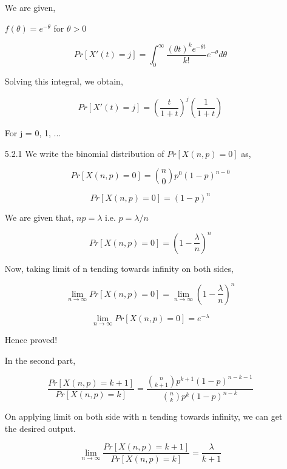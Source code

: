 \documentclass[a4paper,oneside,12pt]{report}
\begin{document}
\begin{enumerate}
	We are given,
	
	$f(\theta) = e^{-\theta}$ for $\theta > 0$
	
	$$Pr[X'(t) = j] = \int_0^{\infty}\frac{(\theta t)^k e^{-\theta t}}{k!} e^{-\theta} d\theta$$

	Solving this integral, we obtain,
	
	$$Pr[X'(t) = j] = \left(\frac{t}{1 + t}\right)^j \left(\frac{1}{1 + t}\right)$$
	
	For j = 0, 1, ...
	
	\item[5.2.1] We write the binomial distribution of $Pr[X(n, p) = 0]$ as,
	
	$$ Pr[X(n, p) = 0] = {n \choose 0} p^0 (1-p)^{n - 0} $$
	
	$$ Pr[X(n, p) = 0] = (1-p)^n $$
	
	We are given that, $np = \lambda$ i.e. $p = \lambda/n$
	
	$$ Pr[X(n, p) = 0] = \left(1-\frac{\lambda}{n}\right)^n $$

	Now, taking limit of n tending towards infinity on both sides,
	
	$$ \lim_{n\to\infty} Pr[X(n, p) = 0] = \lim_{n\to\infty} \left(1-\frac{\lambda}{n}\right)^n $$
	
	$$ \lim_{n\to\infty} Pr[X(n, p) = 0] = e^{-\lambda}$$
	
	Hence proved!
	
	In the second part,
	
	$$\frac{Pr[X(n, p) = k + 1]}{Pr[X(n, p) = k]} = \frac{{n \choose k + 1} p^{k + 1} (1 - p)^{n - k - 1}}{{n \choose k} p^{k} (1 - p)^{n - k}}$$
	
	On applying limit on both side with n tending towards infinity, we can get the desired output.
	
	$$\lim_{n\to\infty} \frac{Pr[X(n, p) = k + 1]}{Pr[X(n, p) = k]} = \frac{\lambda}{k + 1}$$
	
\end{enumerate}
\end{document}
